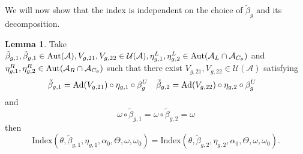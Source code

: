 \documentclass[12pt,a4paper,twoside]{article}
\let\originalleft\left
\let\originalright\right
\renewcommand{\left}{\mathopen{}\mathclose\bgroup\originalleft}
\renewcommand{\right}{\aftergroup\egroup\originalright}
\newcommand{\UU}{\mathcal U}
\renewcommand{\AA}{\mathcal A}
\newcommand{\Ad}[1]{\textrm{Ad}\left(#1\right)}
\newcommand{\Aut}[1]{\textrm{Aut}\left(#1\right)}
\theoremstyle{definition}
\newtheorem{lemma}[theorem]{Lemma}
\numberwithin{equation}{section}
\begin{document}
We will now show that the index is independent on the choice of $\tilde{\beta}_g$ and its decomposition.
\begin{lemma}\label{lem:InvarianceUnderChoiceBeta}
	Take $\tilde{\beta}_{g,1},\tilde{\beta}_{g,1}\in\Aut{\AA},V_{g,21},V_{g,22}\in\UU(\AA),\eta_{g,1}^L,\eta_{g,2}^L\in \Aut{\AA_L\cap\AA_{C_\theta}}$ and $\eta_{g,1}^R,\eta_{g,2}^R\in \Aut{\AA_R\cap\AA_{C_\theta}}$ such that there exist $V_{g,21},V_{g,22}\in\UU(\AA)$ satisfying
	\begin{align}\label{eq:InvarianceUnderChoiceBetaTwoBetas}
		\tilde{\beta}_{g,1}&=\Ad{V_{g,21}}\circ\eta_{g,1}\circ\beta^U_g&\tilde{\beta}_{g,2}&=\Ad{V_{g,22}}\circ\eta_{g,2}\circ\beta^U_g
	\end{align}
	and
	\begin{equation}
		\omega\circ\tilde{\beta}_{g,1}=\omega\circ\tilde{\beta}_{g,2}=\omega
	\end{equation}
	then
	\begin{equation}
		\textrm{Index}(\theta,\tilde{\beta}_{g,1},\eta_{g,1},\alpha_{0},\Theta,\omega,\omega_0)=\textrm{Index}(\theta,\tilde{\beta}_{g,2},\eta_{g,2},\alpha_{0},\Theta,\omega,\omega_0).
	\end{equation}
\end{lemma}
\end{document}
